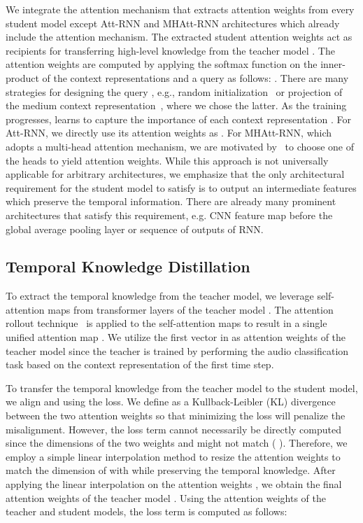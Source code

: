 \documentclass{article}
\begin{document}
We integrate the attention mechanism that extracts attention weights  from every student model except Att-RNN and MHAtt-RNN architectures which already include the attention mechanism.
The extracted student attention weights act as recipients for transferring high-level knowledge from the teacher model .
The attention weights are computed by applying the softmax function on the inner-product of the context representations  and a query  as follows: .
There are many strategies for designing the query , e.g., random initialization~\cite{yang2016hierarchical} or projection of the medium context representation~\cite{Andrade2018aneural}, where we chose the latter.
As the training progresses,  learns to capture the importance of each context representation .
For Att-RNN, we directly use its attention weights as .
For MHAtt-RNN, which adopts a multi-head attention mechanism, we are motivated by~\cite{vaswani2017attention} to choose one of the heads to yield attention weights.
While this approach is not universally applicable for arbitrary architectures, we emphasize that the only architectural requirement for the student model to satisfy is to output an intermediate features which preserve the temporal information.
There are already many prominent architectures that satisfy this requirement, e.g. CNN feature map before the global average pooling layer or sequence of outputs of RNN.

\subsection{Temporal Knowledge Distillation}\label{subsec:3_zero_overhead_attention_distillation}
To extract the temporal knowledge from the teacher model, we leverage  self-attention maps  from  transformer layers of the teacher model .
The attention rollout technique~\cite{DBLP:conf/acl/AbnarZ20} is applied to the self-attention maps to result in a single unified attention map .
We utilize the first vector  in  as attention weights of the teacher model since the teacher is trained by performing the audio classification task based on the context representation  of the first time step.

To transfer the temporal knowledge from the teacher model to the student model, we align  and  using the  loss.
We define  as a Kullback-Leibler (KL) divergence between the two attention weights so that minimizing the loss will penalize the misalignment.
However, the loss term  cannot necessarily be directly computed since the dimensions of the two weights  and  might not match (  ).
Therefore, we employ a simple linear interpolation method to resize the attention
weights to match the dimension of  with  while preserving the temporal knowledge.
After applying the linear interpolation on the attention weights , we obtain the final attention weights  of the teacher model .
Using the attention weights of the teacher and student models, the loss term  is computed as follows:
\end{document}
